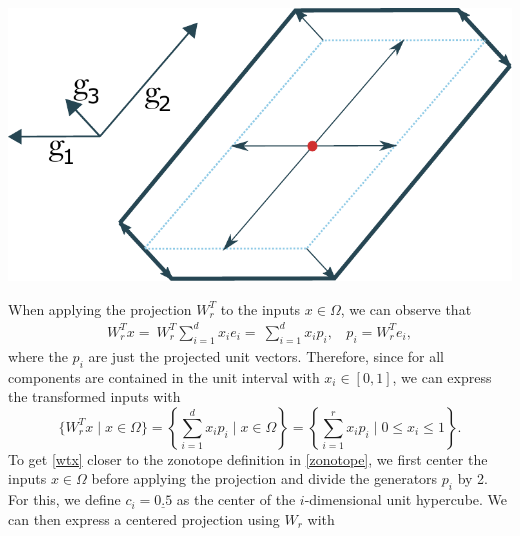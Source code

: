 \documentclass[
  a4paper,  %
  twoside,  %
  bibliography=totoc,
  headsepline,
  cleardoublepage=empty,
  parskip=half,
  draft=false
]{scrbook}
\begin{document}
\begin{mdframed}[style=style]
        \centering
\begin{minipage}{.3\textwidth}
        \centering
  \label{fig:zonotope}
    \end{minipage}%
    \begin{minipage}{0.7\textwidth}
        \centering
        \vspace{3.5mm}
  \includegraphics[width=0.8\linewidth]{graphics/zonotope}
  \hspace{-5.5mm}
    \end{minipage}
\end{mdframed}
%
When applying the projection $W_r^T$ to the inputs $x \in \Omega$, we can observe that
\begin{equation}
\begin{split}
W_r^T x=~W_r^T \sum_{i=1}^d x_i e_i=~\sum_{i=1}^d x_i p_i , ~~~~ p_i=W_r^T e_i,
\end{split}
\end{equation}
where the $p_i$ are just the projected unit vectors.
Therefore, since for all components are contained in the unit interval with $x_i \in [0,1]$, we can express the transformed inputs with
\begin{equation}
\{W_r^T x \mid x \in \Omega\}=\left\{\sum_{i=1}^d x_i p_i \mid x \in \Omega \right\}=\left\{ \sum_{i=1}^r x_i p_i \mid 0 \leq x_i \leq 1\right\}.
\label{wtx}
\end{equation}
To get \cref{wtx} closer to the zonotope definition in \cref{zonotope}, we first center the inputs $x \in \Omega$ before applying the projection and divide the generators $p_i$ by 2.
For this, we define $c_i=\underline{0.5}$ as the center of the $i$-dimensional unit hypercube.
We can then express a centered projection using $W_r$ with
\end{document}
